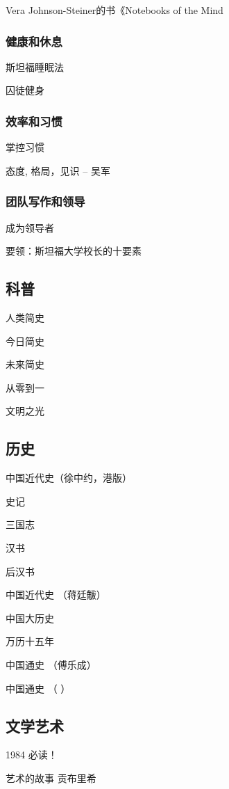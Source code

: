 Vera Johnson-Steiner的书《Notebooks of the Mind

\subsubsection{健康和休息}
斯坦福睡眠法

囚徒健身


\subsubsection{效率和习惯}

掌控习惯

态度,  格局，见识 --  吴军


\subsubsection{团队写作和领导}

成为领导者

要领：斯坦福大学校长的十要素

\subsection{科普}

人类简史

今日简史

未来简史

从零到一

文明之光


\subsection{历史}

中国近代史（徐中约，港版）

史记

三国志


汉书 

后汉书

中国近代史  （蒋廷黻）

中国大历史

万历十五年

中国通史 （傅乐成）

中国通史  （ ）

\subsection{文学艺术}

1984   必读！

艺术的故事  贡布里希

